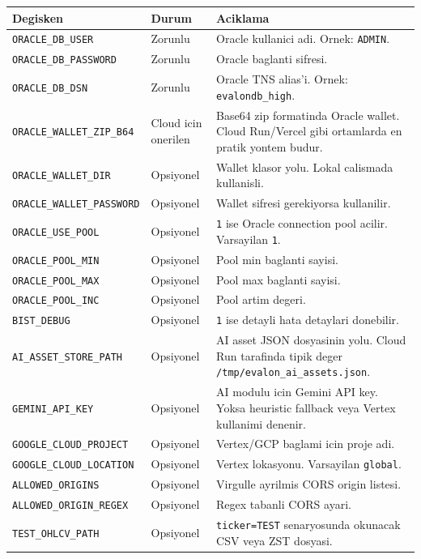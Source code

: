 \documentclass[11pt,a4paper]{article}
\begin{document}
\begin{longtable}{>{\raggedright\arraybackslash}p{4.5cm} >{\raggedright\arraybackslash}p{2.4cm} >{\raggedright\arraybackslash}p{7.5cm}}
\toprule
Degisken & Durum & Aciklama \\
\midrule
\endhead
\texttt{ORACLE\_DB\_USER} & Zorunlu & Oracle kullanici adi. Ornek: \texttt{ADMIN}. \\
\texttt{ORACLE\_DB\_PASSWORD} & Zorunlu & Oracle baglanti sifresi. \\
\texttt{ORACLE\_DB\_DSN} & Zorunlu & Oracle TNS alias'i. Ornek: \texttt{evalondb\_high}. \\
\texttt{ORACLE\_WALLET\_ZIP\_B64} & Cloud icin onerilen & Base64 zip formatinda Oracle wallet. Cloud Run/Vercel gibi ortamlarda en pratik yontem budur. \\
\texttt{ORACLE\_WALLET\_DIR} & Opsiyonel & Wallet klasor yolu. Lokal calismada kullanisli. \\
\texttt{ORACLE\_WALLET\_PASSWORD} & Opsiyonel & Wallet sifresi gerekiyorsa kullanilir. \\
\texttt{ORACLE\_USE\_POOL} & Opsiyonel & \texttt{1} ise Oracle connection pool acilir. Varsayilan \texttt{1}. \\
\texttt{ORACLE\_POOL\_MIN} & Opsiyonel & Pool min baglanti sayisi. \\
\texttt{ORACLE\_POOL\_MAX} & Opsiyonel & Pool max baglanti sayisi. \\
\texttt{ORACLE\_POOL\_INC} & Opsiyonel & Pool artim degeri. \\
\texttt{BIST\_DEBUG} & Opsiyonel & \texttt{1} ise detayli hata detaylari donebilir. \\
\texttt{AI\_ASSET\_STORE\_PATH} & Opsiyonel & AI asset JSON dosyasinin yolu. Cloud Run tarafinda tipik deger \texttt{/tmp/evalon\_ai\_assets.json}. \\
\texttt{GEMINI\_API\_KEY} & Opsiyonel & AI modulu icin Gemini API key. Yoksa heuristic fallback veya Vertex kullanimi denenir. \\
\texttt{GOOGLE\_CLOUD\_PROJECT} & Opsiyonel & Vertex/GCP baglami icin proje adi. \\
\texttt{GOOGLE\_CLOUD\_LOCATION} & Opsiyonel & Vertex lokasyonu. Varsayilan \texttt{global}. \\
\texttt{ALLOWED\_ORIGINS} & Opsiyonel & Virgulle ayrilmis CORS origin listesi. \\
\texttt{ALLOWED\_ORIGIN\_REGEX} & Opsiyonel & Regex tabanli CORS ayari. \\
\texttt{TEST\_OHLCV\_PATH} & Opsiyonel & \texttt{ticker=TEST} senaryosunda okunacak CSV veya ZST dosyasi. \\
\bottomrule
\end{longtable}
\end{document}
